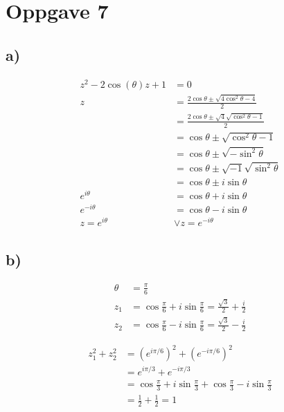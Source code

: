 \documentclass{article}
\begin{document}
\section*{Oppgave 7}
\subsection*{a)}
\begin{align*}
	z^2 - 2\cos(\theta) z + 1 &= 0\\
	z &= \frac{2\cos \theta \pm \sqrt{4 \cos^2\theta - 4}}{2}\\
	 &= \frac{2 \cos \theta \pm \sqrt{4}\sqrt{\cos^2\theta - 1}}{2}\\
	&= \cos \theta \pm \sqrt{\cos^2 \theta - 1}\\
	&= \cos\theta\pm\sqrt{-\sin^2\theta}\tag{$\cos^2\theta - 1 = -\sin^2 \theta$}\\
	&= \cos\theta\pm\sqrt{-1}\sqrt{\sin^2\theta}\\
	&= \cos \theta \pm i\sin\theta\\
	e^{i\theta} &= \cos\theta + i\sin\theta\\
	e^{-i\theta} &= \cos\theta - i\sin\theta\\
	z = e^{i\theta} &\vee z = e^{-i\theta}
\end{align*}
\subsection*{b)}
\begin{align*}
	\theta&=\frac{\pi}{6}\\
	z_1 &= \cos\frac{\pi}{6} + i\sin\frac{\pi}{6} = \frac{\sqrt{3}}{2} + \frac{i}{2}\\
	z_2 &= \cos\frac{\pi}{6} - i\sin\frac{\pi}{6} = \frac{\sqrt{3}}{2} - \frac{i}{2}
\end{align*}
\begin{figure}[H]
\centering
{}
\end{figure}
\begin{align*}
	z_1^2 + z_2^2 &= \left(e^{i\pi/6}\right)^2 + \left(e^{-i\pi/6}\right)^2\\
	&=e^{i\pi/3}+e^{-i\pi/3}\\
	&=\cos\frac{\pi}{3}+i\sin\frac{\pi}{3}+\cos\frac{\pi}{3}-i\sin\frac{\pi}{3}\\
	&=\frac{1}{2} + \frac{1}{2} = 1
\end{align*}
\end{document}
